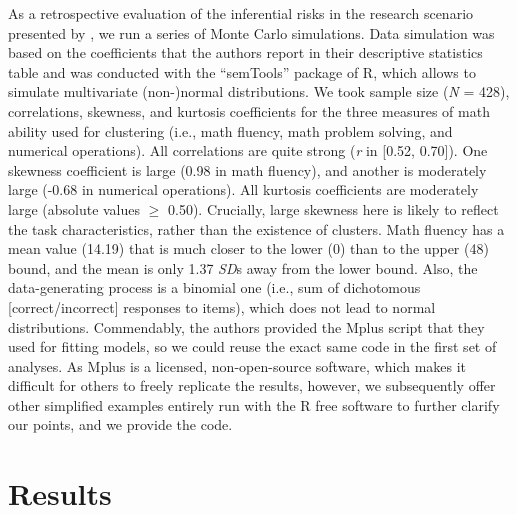 \documentclass[letterpaper,11pt]{article}
\begin{document}
As a retrospective evaluation of the inferential risks in the research scenario presented by , we run a series of Monte Carlo simulations. Data simulation was based on the coefficients that the authors report in their descriptive statistics table and was conducted with the “semTools” package of R, which allows to simulate multivariate (non-)normal distributions. We took sample size (\textit{N} = 428), correlations, skewness, and kurtosis coefficients for the three measures of math ability used for clustering (i.e., math fluency, math problem solving, and numerical operations). All correlations are quite strong (\textit{r} in [0.52, 0.70]). One skewness coefficient is large (0.98 in math fluency), and another is moderately large (-0.68 in numerical operations). All kurtosis coefficients are moderately large (absolute values $\geq$ 0.50). Crucially, large skewness here is likely to reflect the task characteristics, rather than the existence of clusters. Math fluency has a mean value (14.19) that is much closer to the lower (0) than to the upper (48) bound, and the mean is only 1.37 \textit{SD}s away from the lower bound. Also, the data-generating process is a binomial one (i.e., sum of dichotomous [correct/incorrect] responses to items), which does not lead to normal distributions. Commendably, the authors provided the Mplus script that they used for fitting models, so we could reuse the exact same code in the first set of analyses. As Mplus is a licensed, non-open-source software, which makes it difficult for others to freely replicate the results, however, we subsequently offer other simplified examples entirely run with the R free software \cite{team2010r} to further clarify our points, and we provide the code. 

\section*{Results}
\end{document}
